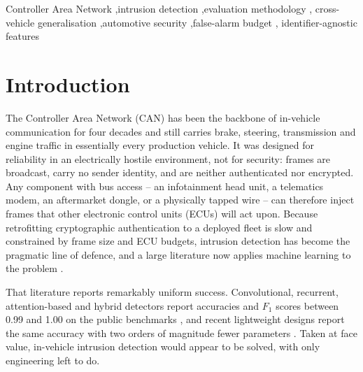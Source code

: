 \documentclass[preprint,11pt,authoryear]{elsarticle}
\begin{document}
\begin{frontmatter}
\begin{keyword}
Controller Area Network \sep intrusion detection \sep evaluation methodology \sep
cross-vehicle generalisation \sep automotive security \sep false-alarm budget \sep
identifier-agnostic features
\end{keyword}

\end{frontmatter}

\section{Introduction}
\label{sec:intro}

The Controller Area Network (CAN) has been the backbone of in-vehicle communication for four
decades and still carries brake, steering, transmission and engine traffic in essentially every
production vehicle. It was designed for reliability in an electrically hostile environment, not for
security: frames are broadcast, carry no sender identity, and are neither authenticated nor
encrypted. Any component with bus access -- an infotainment head unit, a telematics modem, an
aftermarket dongle, or a physically tapped wire -- can therefore inject frames that other electronic
control units (ECUs) will act upon. Because retrofitting cryptographic authentication to a
deployed fleet is slow and constrained by frame size and ECU budgets, intrusion detection has become
the pragmatic line of defence, and a large literature now applies machine learning to the problem
\citep{rajapaksha2022survey,ghadi2026survey}.

That literature reports remarkably uniform success. Convolutional, recurrent, attention-based and
hybrid detectors report accuracies and $F_1$ scores between 0.99 and 1.00 on the public benchmarks
\citep{song2020dcnn,lo2022hydlids,rai2025securing,saravanan2025oadl,zhao2025dsckan}, and recent
lightweight designs report the same accuracy with two orders of magnitude fewer parameters
\citep{le2026tinycnn,singh2026efficient}. Taken at face value, in-vehicle intrusion detection would
appear to be solved, with only engineering left to do.
\end{document}
